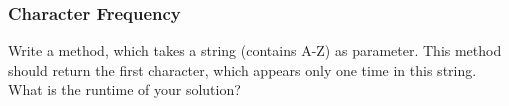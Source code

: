 \begin{frame}[fragile]
\frametitle{Character Frequency}
\begin{exercise}
Write a method, which takes a string (contains A-Z) as parameter. This method
should return the first character, which appears only one time
in this string.\\
What is the runtime of your solution?
\end{exercise}

\end{frame}
